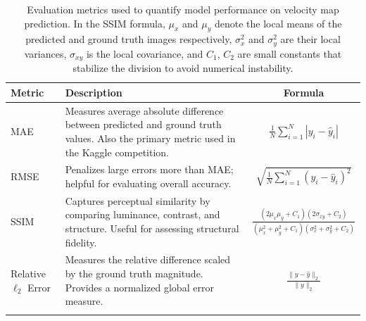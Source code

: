 \documentclass{article}
\begin{document}
\begin{table}
    \centering
    \renewcommand{\arraystretch}{1.4}
    \begin{tabular}{@{}p{1cm} p{8cm} c@{}}
    \toprule
    \textbf{Metric} & \textbf{Description} & \textbf{Formula} \\
    \midrule
    MAE & Measures average absolute difference between predicted and ground truth values. Also the primary metric used in the Kaggle competition. & 
    $\displaystyle \frac{1}{N} \sum_{i=1}^{N} |y_i - \hat{y}_i|$ \\
    \addlinespace
    RMSE & Penalizes large errors more than MAE; helpful for evaluating overall accuracy. &
    $\displaystyle \sqrt{ \frac{1}{N} \sum_{i=1}^{N} (y_i - \hat{y}_i)^2 }$ \\
    \addlinespace
    SSIM & Captures perceptual similarity by comparing luminance, contrast, and structure. Useful for assessing structural fidelity. &
    $\displaystyle \frac{(2\mu_x \mu_y + C_1)(2\sigma_{xy} + C_2)}{(\mu_x^2 + \mu_y^2 + C_1)(\sigma_x^2 + \sigma_y^2 + C_2)}$ \\
    \addlinespace
    Relative $\ell_2$ Error & Measures the relative difference scaled by the ground truth magnitude. Provides a normalized global error measure. &
    $\displaystyle \frac{ \| y - \hat{y} \|_2 }{ \| y \|_2 }$ \\
    \bottomrule
    \vspace{0.1em}
    \end{tabular}
    \caption{Evaluation metrics used to quantify model performance on velocity map prediction. In the SSIM formula, $\mu_x$ and $\mu_y$ denote the local means of the predicted and ground truth images respectively, $\sigma_x^2$ and $\sigma_y^2$ are their local variances, $\sigma_{xy}$ is the local covariance, and $C_1$, $C_2$ are small constants that stabilize the division to avoid numerical instability.}
    \label{tab:metrics}
\end{table}



\end{document}
